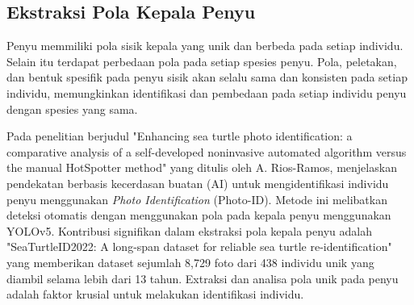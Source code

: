 \subsection{Ekstraksi Pola Kepala Penyu}
Penyu memmiliki pola sisik kepala yang unik dan berbeda pada setiap individu.
Selain itu terdapat perbedaan pola pada setiap spesies penyu.
Pola, peletakan, dan bentuk spesifik pada penyu sisik akan selalu sama dan konsisten pada setiap individu, memungkinkan identifikasi dan pembedaan pada setiap individu penyu dengan spesies yang sama.
\parencite{ecomarBelizeAnatomy}

Pada penelitian berjudul "Enhancing sea turtle photo identification: a comparative analysis of a self-developed noninvasive automated algorithm versus the manual HotSpotter method" yang ditulis oleh A. Rios-Ramos, menjelaskan pendekatan berbasis kecerdasan buatan (AI) untuk mengidentifikasi individu penyu menggunakan \textit{Photo Identification} (Photo-ID).
Metode ini melibatkan deteksi otomatis dengan menggunakan pola pada kepala penyu menggunakan YOLOv5.
\parencite{10.1117/12.3028422}
Kontribusi signifikan dalam ekstraksi pola kepala penyu adalah "SeaTurtleID2022: A long-span dataset for reliable sea turtle re-identification" yang memberikan dataset sejumlah 8,729 foto dari 438 individu unik yang diambil selama lebih dari 13 tahun.
\parencite{adam2024seaturtleid2022longspandatasetreliable}
Extraksi dan analisa pola unik pada penyu adalah faktor krusial untuk melakukan identifikasi individu.